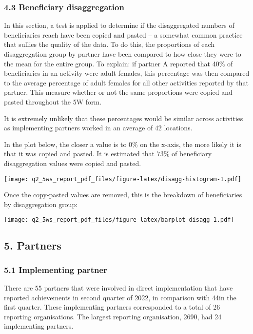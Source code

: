 \documentclass[
]{article}
\begin{document}
\hypertarget{beneficiary-disaggregation}{%
\subsubsection{4.3 Beneficiary
disaggregation}\label{beneficiary-disaggregation}}

In this section, a test is applied to determine if the disaggregated
numbers of beneficiaries reach have been copied and pasted -- a somewhat
common practice that sullies the quality of the data. To do this, the
proportions of each disaggregation group by partner have been compared
to how close they were to the mean for the entire group. To explain: if
partner A reported that 40\% of beneficiaries in an activity were adult
females, this percentage was then compared to the average percentage of
adult females for all other activities reported by that partner. This
measure whether or not the same proportions were copied and pasted
throughout the 5W form.

It is extremely unlikely that these percentages would be similar across
activities as implementing partners worked in an average of 42
locations.

In the plot below, the closer a value is to 0\% on the x-axis, the more
likely it is that it was copied and pasted. It is estimated that 73\% of
beneficiary disaggregation values were copied and pasted.

\texttt{[image: q2\_5ws\_report\_pdf\_files/figure-latex/disagg-histogram-1.pdf]}

Once the copy-pasted values are removed, this is the breakdown of
beneficiaries by disaggregation group:

\texttt{[image: q2\_5ws\_report\_pdf\_files/figure-latex/barplot-disagg-1.pdf]}

\hypertarget{partners}{%
\subsection{5. Partners}\label{partners}}

\hypertarget{implementing-partner}{%
\subsubsection{5.1 Implementing partner}\label{implementing-partner}}

There are 55 partners that were involved in direct implementation that
have reported achievements in second quarter of 2022, in comparison with
44in the first quarter. These implementing partners corresponded to a
total of 26 reporting organisations. The largest reporting organisation,
2690, had 24 implementing partners.
\end{document}
